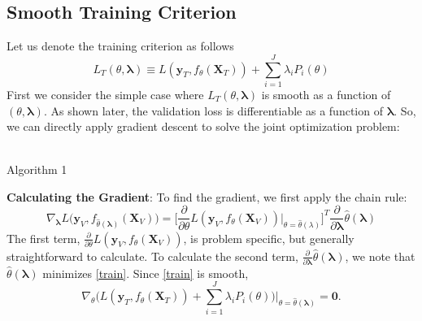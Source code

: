 \documentclass[10pt,letterpaper]{article}
\begin{document}
\subsection{Smooth Training Criterion}
Let us denote the training criterion as follows
\begin{equation}
L_T\left(\theta, \boldsymbol{\lambda}\right) \equiv L(\boldsymbol{y}_T, f_\theta (\boldsymbol{X}_T)) + \sum\limits_{i=1}^J \lambda_i P_i(\theta)
\label{train}
\end{equation}
First we consider the simple case where $L_T\left(\theta, \boldsymbol{\lambda}\right)$ is smooth as a function of $(\theta, \boldsymbol{\lambda})$. As shown later, the validation loss is differentiable as a function of $\boldsymbol{\lambda}$. So, we can directly apply gradient descent to solve the joint optimization problem:
\begin{center}
  \\
  Algorithm 1
\end{center}
\textbf{Calculating the Gradient}:
To find the gradient, we first apply the chain rule:
\begin{equation}
\nabla_{\boldsymbol{\lambda}} L \Big( \boldsymbol{y}_V, f_{\hat{\theta}(\boldsymbol{\lambda})}(\boldsymbol{X}_V) \Big ) = 
\Big [\frac{\partial}{\partial \theta} L ( \boldsymbol{y}_V, f_{\theta}(\boldsymbol{X}_V)) \Big |_{\theta=\hat{\theta}(\lambda)} \Big ]^T 
\frac{\partial}{\partial \boldsymbol{\lambda}} \hat{\theta}(\boldsymbol{\lambda})
\label{chainrule}
\end{equation}
The first term, $\frac{\partial}{\partial \theta} L ( \boldsymbol{y}_V, f_{\theta}(\boldsymbol{X}_V))$, is problem specific, but generally straightforward to calculate. To calculate the second term, $\frac{\partial}{\partial \boldsymbol{\lambda}} \hat{\theta}(\boldsymbol{\lambda})$, we note that $\hat{\theta}(\boldsymbol{\lambda})$ minimizes \eqref{train}. Since \eqref{train} is smooth,
\begin{equation}
\nabla_\theta \Big ( L(\boldsymbol{y}_T, f_\theta (\boldsymbol{X}_T)) + \sum\limits_{i=1}^J \lambda_i P_i(\theta) \Big ) \Big |_{\theta = \hat \theta(\boldsymbol{\lambda})} = \boldsymbol{0}.
\label{eq:grad}
\end{equation}
\end{document}
